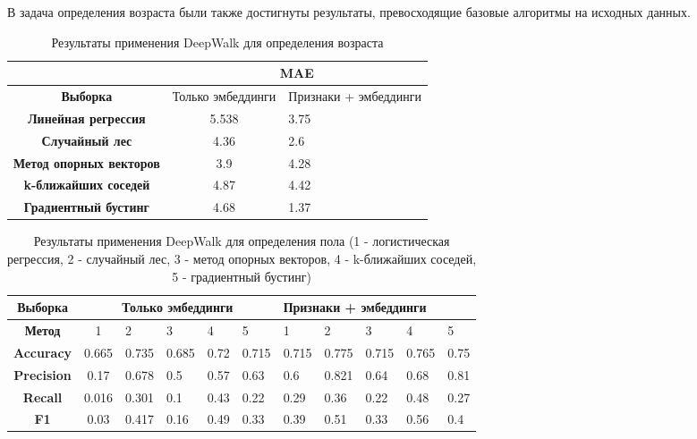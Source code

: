 В задача определения возраста были также достигнуты результаты, превосходящие базовые алгоритмы на исходных данных.

\begin{table}[h!]
\centering
\begin{tabular}{|c|c|l|}
\hline
\textbf{}                       & \multicolumn{2}{c|}{MAE}                  \\ \hline
\textbf{Выборка}                & Только эмбеддинги & Признаки + эмбеддинги \\ \hline
\textbf{Линейная регрессия}     & 5.538             & 3.75                  \\ \hline
\textbf{Случайный лес}          & 4.36              & 2.6                   \\ \hline
\textbf{Метод опорных векторов} & 3.9               & 4.28                  \\ \hline
\textbf{k-ближайших соседей}    & 4.87              & 4.42                  \\ \hline
\textbf{Градиентный бустинг}    & 4.68              & 1.37     \\ \hline
\end{tabular}
\caption{Результаты применения DeepWalk для определения возраста}
\label{DeepWalk age table}
\end{table}

\begin{table}[h!]
\centering
\begin{tabular}{|c|c|l|l|l|l|l|l|l|l|l|}
\hline
\textbf{Выборка}   & \multicolumn{5}{c|}{Только эмбеддинги} & \multicolumn{5}{l|}{Признаки + эмбеддинги} \\ \hline
\textbf{Метод}     & 1   & 2      & 3      & 4     & 5      & 1   & 2       & 3       & 4       & 5      \\ \hline
\textbf{Accuracy}  & 0.665    & 0.735  & 0.685  & 0.72  & 0.715  &  0.715   & 0.775   & 0.715   & 0.765   & 0.75   \\ \hline
\textbf{Precision} &   0.17  & 0.678  & 0.5    & 0.57  & 0.63   &   0.6  & 0.821   & 0.64    & 0.68    & 0.81   \\ \hline
\textbf{Recall}    &  0.016  & 0.301  & 0.1    & 0.43  & 0.22   &  0.29   & 0.36    & 0.22    & 0.48    & 0.27   \\ \hline
\textbf{F1}        & 0.03    & 0.417  & 0.16   & 0.49  & 0.33   &  0.39   & 0.51    & 0.33    & 0.56    & 0.4    \\ \hline
\end{tabular}
\caption{Результаты применения DeepWalk для определения пола (1 - логистическая регрессия, 2 - случайный лес, 3 - метод опорных векторов, 4 - k-ближайших соседей, 5 - градиентный бустинг)}
\label{DeepWalk gender table}
\end{table}




